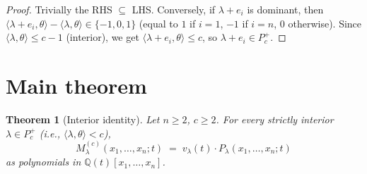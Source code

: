 \documentclass[11pt]{article}
\newtheorem{theorem}{Theorem}
\theoremstyle{definition}
\newcommand{\Pcp}{P_c^+}
\newcommand{\Q}{\mathbb{Q}}
\newcommand{\ip}[2]{\langle #1, #2 \rangle}
\begin{document}
\begin{proof}
Trivially the RHS $\subseteq$ LHS. Conversely, if $\lambda + e_i$ is
dominant, then $\ip{\lambda + e_i}{\theta} - \ip{\lambda}{\theta} \in \{-1, 0, 1\}$
(equal to $1$ if $i = 1$, $-1$ if $i = n$, $0$ otherwise). Since
$\ip{\lambda}{\theta} \le c-1$ (interior), we get
$\ip{\lambda+e_i}{\theta} \le c$, so $\lambda + e_i \in \Pcp$.
\end{proof}

\section{Main theorem}

\begin{theorem}[Interior identity]
\label{thm:main}
Let $n \ge 2$, $c \ge 2$. For every strictly interior $\lambda \in \Pcp$
(i.e., $\ip{\lambda}{\theta} < c$),
\begin{equation}
M^{(c)}_\lambda(x_1,\ldots,x_n;t)
\;=\; v_\lambda(t) \cdot P_\lambda(x_1,\ldots,x_n;t)
\label{eq:main}
\end{equation}
as polynomials in $\Q(t)[x_1,\ldots,x_n]$.
\end{theorem}
\end{document}
